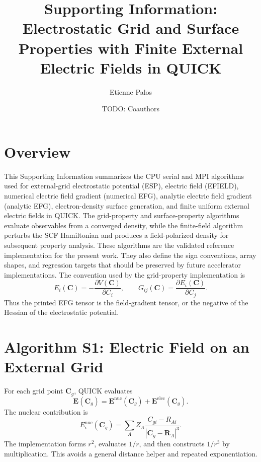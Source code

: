 \documentclass[journal=jcisd8,manuscript=suppinfo]{achemso}
\title{Supporting Information: Electrostatic Grid and Surface Properties with Finite External Electric Fields in QUICK}
\author{Etienne Palos}
\affiliation{Department of Chemistry, Michigan State University, East Lansing, Michigan, United States}
\author{TODO: Coauthors}
\affiliation{TODO: Affiliations}
\begin{document}
\section{Overview}

This Supporting Information summarizes the CPU serial and MPI algorithms used for external-grid electrostatic potential (ESP), electric field (EFIELD), numerical electric field gradient (numerical EFG), analytic electric field gradient (analytic EFG), electron-density surface generation, and finite uniform external electric fields in QUICK.  The grid-property and surface-property algorithms evaluate observables from a converged density, while the finite-field algorithm perturbs the SCF Hamiltonian and produces a field-polarized density for subsequent property analysis.  These algorithms are the validated reference implementation for the present work.  They also define the sign conventions, array shapes, and regression targets that should be preserved by future accelerator implementations.  The convention used by the grid-property implementation is
\begin{equation}
  E_i(\mathbf{C})=-\frac{\partial V(\mathbf{C})}{\partial C_i},
  \qquad
  G_{ij}(\mathbf{C})=\frac{\partial E_i(\mathbf{C})}{\partial C_j}.
\end{equation}
Thus the printed EFG tensor is the field-gradient tensor, or the negative of the Hessian of the electrostatic potential.

\section{Algorithm S1: Electric Field on an External Grid}

For each grid point \(\mathbf{C}_g\), QUICK evaluates
\begin{equation}
  \mathbf{E}(\mathbf{C}_g)
  =
  \mathbf{E}^{\mathrm{nuc}}(\mathbf{C}_g)
  +
  \mathbf{E}^{\mathrm{elec}}(\mathbf{C}_g).
\end{equation}
The nuclear contribution is
\begin{equation}
  E_i^{\mathrm{nuc}}(\mathbf{C}_g)
  =
  \sum_A Z_A \frac{C_{gi}-R_{Ai}}{|\mathbf{C}_g-\mathbf{R}_A|^3}.
\end{equation}
The implementation forms \(r^2\), evaluates \(1/r\), and then constructs \(1/r^3\) by multiplication.  This avoids a general distance helper and repeated exponentiation.
\end{document}
